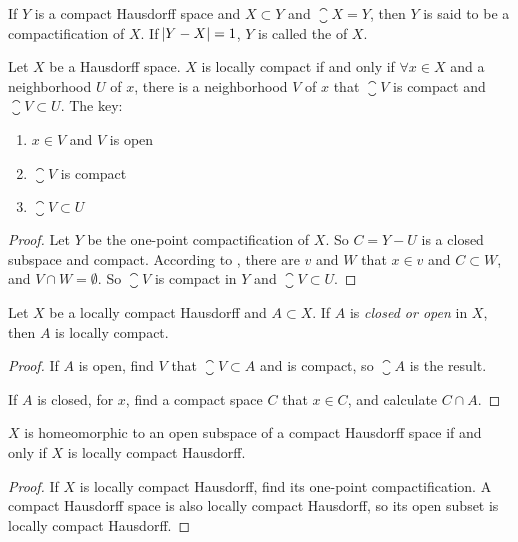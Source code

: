 \begin{definition}
    If $Y$ is a compact Hausdorff space and $X \subset Y$ and $\closure{X} = Y$, then $Y$ is said to be a compactification of $X$. If $\abs{Y - X} = 1$, $Y$ is called the  of $X$.
\end{definition}

\begin{theorem}
    Let $X$ be a Hausdorff space. $X$ is locally compact if and only if $\forall x \in X$ and a neighborhood $U$ of $x$, there is a neighborhood $V$ of $x$ that $\closure{V}$ is compact and $\closure{V} \subset U$.
    The key:
    \begin{enumerate}
        \item $x \in V$  and $V$ is open
        \item $\closure{V}$ is compact
        \item $\closure{V} \subset U$
    \end{enumerate}
\end{theorem}
\begin{proof}
    Let $Y$ be the one-point compactification of $X$. So $C = Y - U$ is a closed subspace and compact. According to , there are $v$ and $W$ that $x \in v$ and $C \subset W$, and $V \cap W = \emptyset$. So $\closure{V}$ is compact in $Y$ and $\closure{V} \subset U$.
\end{proof}

\begin{theorem}
    Let $X$ be a locally compact Hausdorff and $A \subset X$. If $A$ is \emph{closed or open} in $X$, then $A$ is locally compact.
\end{theorem}
\begin{proof}
    If $A$ is open, find $V$ that $\closure{V} \subset A$ and is compact, so $\closure{A}$ is the result. 
    
    If $A$ is closed, for $x$, find a compact space $C$ that $x \in C$, and calculate $C \cap A$.
\end{proof}

\begin{theorem}
    $X$ is homeomorphic to an open subspace of a compact Hausdorff space if and only if $X$ is locally compact Hausdorff.
\end{theorem}
\begin{proof}
    If $X$ is locally compact Hausdorff, find its one-point compactification. A compact Hausdorff space is also locally compact Hausdorff, so its open subset is locally compact Hausdorff.
\end{proof}





